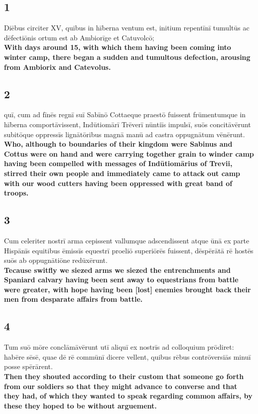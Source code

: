 \documentclass{article}
\begin{document}
\subsection*{1}
Diēbus circiter XV, quibus in hīberna ventum est, initium repentīnī tumultūs ac dēfectiōnis ortum est ab Ambiorīge et Catuvolcō;\\
\textbf{With days around 15, with which them having been coming into winter camp, there began a sudden and tumultous defection, arousing from Ambiorix and Catevolus.}

\subsection*{2}
quī, cum ad fīnēs regnī suī Sabīnō Cottaeque praestō fuissent frūmentumque in hīberna comportāvissent, Indūtiomārī Trēverī nūntiīs impulsī, suōs concitāvērunt subitōque oppressīs lignātōribus magnā manū ad castra oppugnātum vēnērunt.\\
\textbf{Who, although to boundaries of their kingdom were Sabinus and Cottus were on hand and were carrying together grain to winder camp having been compelled with messages of Indūtiomārius of Trevii, stirred their own people and immediately came to attack out camp with our wood cutters having been oppressed with great band of troops.}

\subsection*{3}
Cum celeriter nostrī arma cepissent vallumque adscendissent atque ūnā ex parte Hispānīs equitibus ēmissīs equestrī proeliō superiōrēs fuissent, dēspērātā rē hostēs suōs ab oppugnātiōne redūxērunt.\\
\textbf{Tecause switfly we siezed arms we siezed the entrenchments and Spaniard calvary having been sent away to equestrians from battle were greater, with hope having been [lost] enemies brought back their men from desparate affairs from battle.}

\subsection*{4}
Tum suō mōre conclāmāvērunt utī aliquī ex nostrīs ad colloquium prōdiret: habēre sēsē, quae dē rē commūnī dicere vellent, quibus rēbus contrōversiās minuī posse spērārent.\\
\textbf{Then they shouted according to their custom that someone go forth from our soldiers so that they might advance to converse and that they had, of which they wanted to speak regarding common affairs, by these they hoped to be without arguement.}
\end{document}
